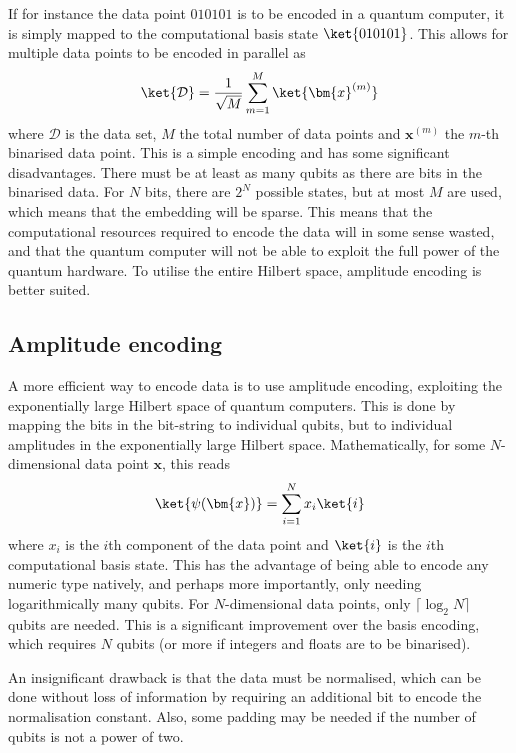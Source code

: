 If for instance the data point $010101$ is to be encoded in a quantum computer, it is simply mapped to the computational basis state $\ket{010101}$.
This allows for multiple data points to be encoded in parallel as
\begin{equation}
    \ket{\mathcal{D}} = \frac{1}{\sqrt M} \sum_{m=1}^M \ket{\bm{x}^{(m)}}
\end{equation}
where $\mathcal{D}$ is the data set, $M$ the total number of data points and $\bm{x}^{(m)}$ the $m$-th binarised data point.
This is a simple encoding and has some significant disadvantages.
There must be at least as many qubits as there are bits in the binarised data.
For $N$ bits, there are $2^N$ possible states, but at most $M$ are used, which means that the embedding will be sparse.
This means that the computational resources required to encode the data will in some sense wasted, and that the quantum computer will not be able to exploit the full power of the quantum hardware.
To utilise the entire Hilbert space, amplitude encoding is better suited.

\subsection{Amplitude encoding}
A more efficient way to encode data is to use amplitude encoding, exploiting the exponentially large Hilbert space of quantum computers.
This is done by mapping the bits in the bit-string to individual qubits, but to individual amplitudes in the exponentially large Hilbert space.
Mathematically, for some $N$-dimensional data point $\bm{x}$, this reads
\begin{equation}
    \ket{\psi(\bm{x})} = \sum_{i=1}^{N} x_i \ket{i}
\end{equation}
where $x_i$ is the $i$th component of the data point and $\ket{i}$ is the $i$th computational basis state.
This has the advantage of being able to encode any numeric type natively, and perhaps more importantly, only needing logarithmically many qubits.
For $N$-dimensional data points, only $\lceil \log_2 N \rceil$ qubits are needed.
This is a significant improvement over the basis encoding, which requires $N$ qubits (or more if integers and floats are to be binarised).

An insignificant drawback is that the data must be normalised, which can be done without loss of information by requiring an additional bit to encode the normalisation constant.
Also, some padding may be needed if the number of qubits is not a power of two.

